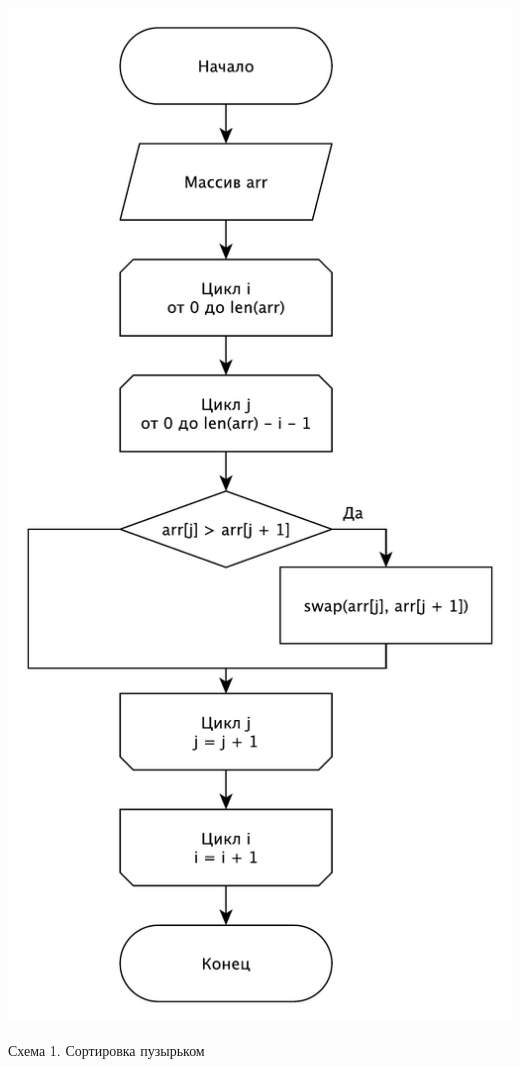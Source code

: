 \documentclass[a4paper,12pt]{article}
\begin{document}
\begin{center}
    \includegraphics[scale=0.4]{Bubble}

    Схема 1. Сортировка пузырьком
\end{center}
\end{document}
